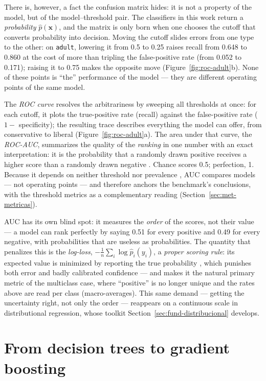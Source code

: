 There is, however, a fact the confusion matrix hides: it is not a
property of the model, but of the model--threshold pair. The
classifiers in this work return a \emph{probability}
$\hat p(\mathbf{x})$, and the matrix is only born when one chooses
the cutoff that converts probability into decision. Moving the
cutoff slides errors from one type to the other: on \texttt{adult},
lowering it from 0.5 to 0.25 raises recall from 0.648 to 0.860 at
the cost of more than tripling the false-positive rate (from 0.052
to 0.171); raising it to 0.75 makes the opposite move
(Figure~\ref{fig:roc-adult}b). None of these points is ``the''
performance of the model --- they are different operating points of
the same model.

The \emph{ROC curve} resolves the arbitrariness by sweeping all
thresholds at once: for each cutoff, it plots the true-positive rate
(recall) against the false-positive rate ($1-$ specificity); the
resulting trace describes everything the model can offer, from
conservative to liberal (Figure~\ref{fig:roc-adult}a). The area
under that curve, the \emph{ROC-AUC}, summarizes the quality of the
\emph{ranking} in one number with an exact interpretation: it is the
probability that a randomly drawn positive receives a higher score
than a randomly drawn negative \citep{hanley1982}. Chance scores
0.5; perfection, 1. Because it depends on neither threshold nor
prevalence \citep{fawcett2006}, AUC compares models --- not
operating points --- and therefore anchors the benchmark's
conclusions, with the threshold metrics as a complementary reading
(Section~\ref{sec:met-metricas}).

AUC has its own blind spot: it measures the \emph{order} of the
scores, not their value --- a model can rank perfectly by saying
0.51 for every positive and 0.49 for every negative, with
probabilities that are useless as probabilities. The quantity that
penalizes this is the \emph{log-loss},
$-\frac{1}{n}\sum_i \log \hat p_i(y_i)$, a \emph{proper scoring
rule}: its expected value is minimized by reporting the true
probability \citep{gneiting2007}, which punishes both error and
badly calibrated confidence --- and makes it the natural primary
metric of the multiclass case, where ``positive'' is no longer
unique and the rates above are read per class (macro-averages). This
same demand --- getting the uncertainty right, not only the order
--- reappears on a continuous scale in distributional regression,
whose toolkit Section~\ref{sec:fund-distribucional} develops.

\section{From decision trees to gradient boosting}
\label{sec:fund-gbdt}

